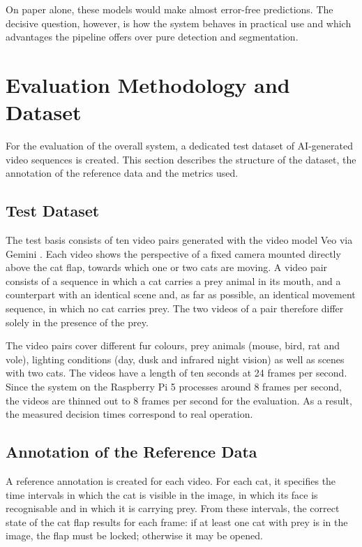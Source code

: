 On paper alone, these models would make almost error-free predictions. The decisive question, however, is how the system behaves in practical use and which advantages the pipeline offers over pure detection and segmentation.

\section{Evaluation Methodology and Dataset}
\label{sec:evaluationsmethodik}
For the evaluation of the overall system, a dedicated test dataset of AI-generated video sequences is created. This section describes the structure of the dataset, the annotation of the reference data and the metrics used.

\subsection{Test Dataset}
The test basis consists of ten video pairs generated with the video model Veo via Gemini \cite{geminiteam2023gemini}. Each video shows the perspective of a fixed camera mounted directly above the cat flap, towards which one or two cats are moving. A video pair consists of a sequence in which a cat carries a prey animal in its mouth, and a counterpart with an identical scene and, as far as possible, an identical movement sequence, in which no cat carries prey. The two videos of a pair therefore differ solely in the presence of the prey.

The video pairs cover different fur colours, prey animals (mouse, bird, rat and vole), lighting conditions (day, dusk and infrared night vision) as well as scenes with two cats. The videos have a length of ten seconds at 24 frames per second. Since the system on the Raspberry Pi 5 processes around 8 frames per second, the videos are thinned out to 8 frames per second for the evaluation. As a result, the measured decision times correspond to real operation.

\subsection{Annotation of the Reference Data}
A reference annotation is created for each video. For each cat, it specifies the time intervals in which the cat is visible in the image, in which its face is recognisable and in which it is carrying prey. From these intervals, the correct state of the cat flap results for each frame: if at least one cat with prey is in the image, the flap must be locked; otherwise it may be opened.

